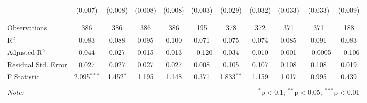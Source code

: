 \begin{table}[H]
\begin{tabular}{@{\extracolsep{4pt}}lcccccccccc}
  & (0.007) & (0.008) & (0.008) & (0.008) & (0.003) & (0.029) & (0.032) & (0.033) & (0.033) & (0.009) \\ 
  & & & & & & & & & & \\ 
\hline \\[-1.8ex] 
Observations & 386 & 386 & 386 & 386 & 195 & 378 & 372 & 371 & 371 & 188 \\ 
R$^{2}$ & 0.083 & 0.088 & 0.095 & 0.100 & 0.071 & 0.075 & 0.074 & 0.085 & 0.091 & 0.083 \\ 
Adjusted R$^{2}$ & 0.044 & 0.027 & 0.015 & 0.013 & $-$0.120 & 0.034 & 0.010 & 0.001 & $-$0.0005 & $-$0.106 \\ 
Residual Std. Error & 0.027 & 0.027 & 0.027 & 0.027 & 0.008 & 0.105 & 0.107 & 0.108 & 0.108 & 0.019 \\ 
F Statistic & 2.095$^{***}$ & 1.452$^{*}$ & 1.195 & 1.148 & 0.371 & 1.833$^{**}$ & 1.159 & 1.017 & 0.995 & 0.439 \\ 
\hline 
\hline \\[-1.8ex] 
\textit{Note:}  & \multicolumn{10}{r}{$^{*}$p$<$0.1; $^{**}$p$<$0.05; $^{***}$p$<$0.01} \\ 
\end{tabular} 
\end{table} 
